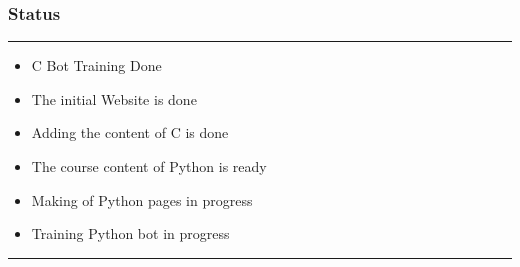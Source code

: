 \documentclass[14pt]{beamer}
\begin{document}
\begin{frame}
    \frametitle{Status}
    \noindent
    {\color{blue} \rule{\linewidth}{0.7mm} }
    \begin{itemize}
        \pause
    \item C Bot Training Done \\
        \pause
    \item The initial Website is done \\
        \pause
    \item Adding the content of C is done \\ 
        \pause
    \item The course content of Python is ready \\
        \pause
    \item Making of Python pages in progress \\
        \pause
    \item Training Python bot in progress \\
\end{itemize}
\noindent
    {\color{blue} \rule{\linewidth}{0.7mm} }
\end{frame}
    
\end{document}
